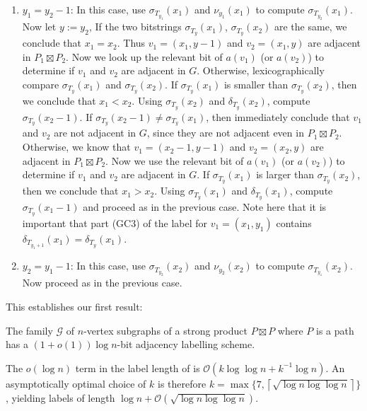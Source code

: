 \documentclass[kpfonts]{patmorin}
\newcommand{\Oh}{\mathcal{O}}
\begin{document}
\begin{enumerate}
  \item $y_1=y_2-1$:
  In this case, use $\sigma_{T_{y_1}}(x_1)$ and $\nu_{y_1}(x_1)$ to compute $\sigma_{T_{y_2}}(x_1)$.
  Now let $y:=y_2$,
  If the two bitstrings $\sigma_{T_y}(x_1)$, $\sigma_{T_y}(x_2)$ are the same,
  we conclude that $x_1=x_2$. Thus $v_1=(x_1,y-1)$ and $v_2=(x_1,y)$ are adjacent in $P_1\boxtimes P_2$.
  Now we look up the relevant bit of $a(v_1)$ (or $a(v_2)$) to determine
  if $v_1$ and $v_2$ are adjacent in $G$.
  Otherwise, lexicographically compare $\sigma_{T_y}(x_1)$ and $\sigma_{T_y}(x_2)$.
  If $\sigma_{T_y}(x_1)$ is smaller than $\sigma_{T_y}(x_2)$, then we conclude that $x_1<x_2$.
  Using $\sigma_{T_y}(x_2)$ and $\delta_{T_y}(x_2)$, compute $\sigma_{T_y}(x_2-1)$.
  If $\sigma_{T_y}(x_2-1)\neq \sigma_{T_y}(x_1)$, then immediately conclude that $v_1$ and $v_2$ are not adjacent in $G$, since they are not adjacent even in $P_1\boxtimes P_2$.  Otherwise, we know that
  $v_1=(x_2-1,y-1)$ and $v_2=(x_2,y)$ are adjacent in $P_1\boxtimes P_2$.
  Now we use the relevant bit of $a(v_1)$ (or $a(v_2)$) to determine if $v_1$ and $v_2$ are adjacent in $G$.
  If $\sigma_{T_y}(x_1)$ is larger than $\sigma_{T_y}(x_2)$, then we conclude that $x_1>x_2$.
  Using $\sigma_{T_y}(x_1)$ and $\delta_{T_y}(x_1)$, compute $\sigma_{T_y}(x_1-1)$ and proceed as in the previous case.
  Note here that it is important that part (GC3) of the label for $v_1=(x_1,y_1)$ contains $\delta_{T_{y_1+1}}(x_1)=\delta_{T_{y}}(x_1)$.

  \item $y_2=y_1-1$: In this case, use $\sigma_{T_{y_2}}(x_2)$ and $\nu_{y_2}(x_2)$ to compute $\sigma_{T_{y_1}}(x_2)$.  Now proceed as in the previous case.
\end{enumerate}

This establishes our first result:

\begin{thm}
  The family $\mathcal{G}$ of $n$-vertex subgraphs of a strong product $P\boxtimes P$ where $P$ is a path has a $(1+o(1))\log n$-bit adjacency labelling scheme.
\end{thm}

\begin{rem}
  The $o(\log n)$ term in the label length of  is $\Oh(k\log\log n + k^{-1}\log n)$.  An asymptotically optimal choice of $k$ is therefore $k=\max\{7,\left\lceil\sqrt{\log n\log\log n}\right\rceil\}$, yielding labels of length $\log n + \Oh\left(\sqrt{\log n\log\log n}\right)$.
\end{rem}
\end{document}
